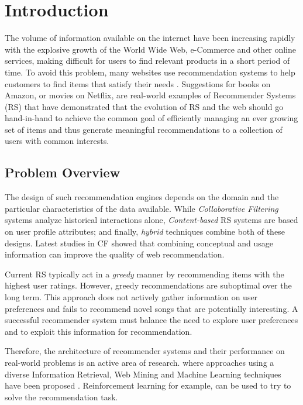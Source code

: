 \chapter{Introduction}
\label{chapterlabel1}

The volume of information available on the internet have been increasing rapidly with the explosive growth of the World Wide Web, e-Commerce and other online services, making difficult for users to find relevant products in a short period of time. To avoid this problem, many websites use recommendation systems to help customers to find items that satisfy their needs \cite{resnick1997recommender}. Suggestions for books on Amazon, or movies on Netflix, are real-world examples of Recommender Systems (RS) that have demonstrated that the evolution of RS and the web should go hand-in-hand to achieve the common goal of efficiently managing an ever growing set of items and  thus generate meaningful recommendations to a collection of users with common interests.

\section{Problem Overview}

The design of such recommendation engines depends on the domain and the particular characteristics of the data available. While \textit{Collaborative Filtering} systems analyze historical interactions alone, \textit{Content-based} RS systems are based on user profile attributes; and finally, \textit{hybrid} techniques combine both of these designs. Latest studies in CF \cite{bobadilla2013recommender} showed that combining conceptual and usage information can improve the quality of web recommendation.

Current RS typically act in a \textit{greedy} manner by recommending items with the highest user ratings. However, greedy recommendations are suboptimal over the long term. This approach does not actively gather information on user preferences and fails to recommend novel songs that are potentially interesting. A successful recommender system must balance the need to explore user preferences and to exploit this information for recommendation.

Therefore, the architecture of recommender systems and their performance on real-world problems is an active area of research. where approaches using a diverse Information Retrieval, Web Mining and Machine Learning techniques have been proposed \cite{bobadilla2013recommender}. Reinforcement learning\cite{sutton1998reinforcement} for example, can be used to try to solve the recommendation task. 

